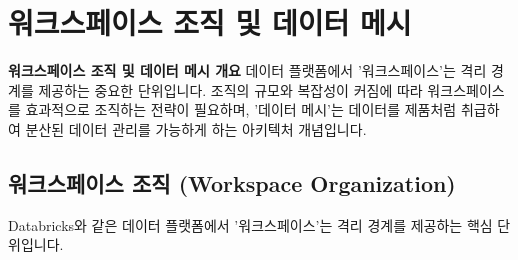 \documentclass[11pt,a4paper]{article}
\theoremstyle{definition}
\begin{document}
\newpage
\section{워크스페이스 조직 및 데이터 메시}

\begin{tcolorbox}[conceptbox] %
\textbf{워크스페이스 조직 및 데이터 메시 개요}
데이터 플랫폼에서 '워크스페이스'는 격리 경계를 제공하는 중요한 단위입니다. 조직의 규모와 복잡성이 커짐에 따라 워크스페이스를 효과적으로 조직하는 전략이 필요하며, '데이터 메시'는 데이터를 제품처럼 취급하여 분산된 데이터 관리를 가능하게 하는 아키텍처 개념입니다.
\end{tcolorbox}

\subsection{워크스페이스 조직 (Workspace Organization)}
Databricks와 같은 데이터 플랫폼에서 '워크스페이스'는 격리 경계를 제공하는 핵심 단위입니다.
\end{document}
